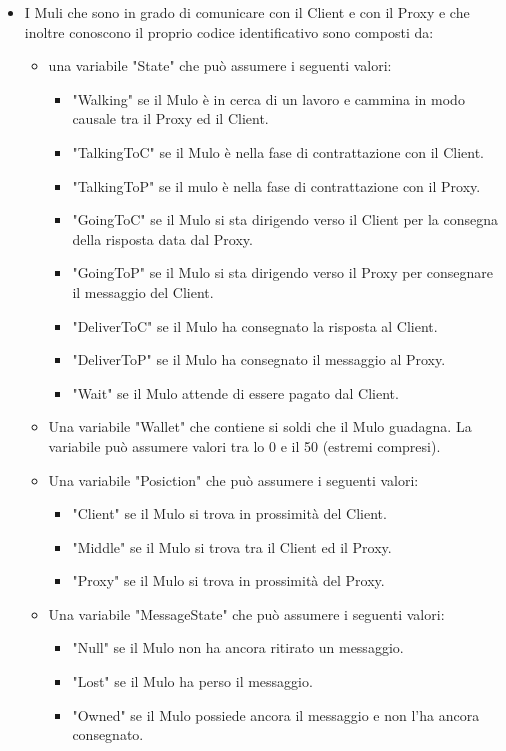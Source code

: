\documentclass[13pt,a4paper]{article}
\begin{document}
\begin{itemize}
	
	\item I Muli che sono in grado di comunicare con il Client e con il Proxy e che inoltre conoscono il proprio codice identificativo sono composti da:
	\begin{itemize}
		\item una variabile "State" che può assumere i seguenti valori:
		\begin{itemize}
			\item "Walking" se il Mulo è in cerca di un lavoro e cammina in modo causale tra il Proxy ed il Client.
			\item "TalkingToC" se il Mulo è nella fase di contrattazione con il Client.
			\item "TalkingToP" se il mulo è nella fase di contrattazione con il Proxy.
			\item "GoingToC" se il Mulo si sta dirigendo verso il Client per la consegna della risposta data dal Proxy.
			\item "GoingToP" se il Mulo si sta dirigendo verso il Proxy per consegnare il messaggio del Client.
			\item "DeliverToC" se il Mulo ha consegnato la risposta al Client.
			\item "DeliverToP" se il Mulo ha consegnato il messaggio al Proxy.
			\item "Wait" se il Mulo attende di essere pagato dal Client.
		\end{itemize}
		\item Una variabile "Wallet" che contiene si soldi che il Mulo guadagna.  La variabile può assumere valori tra lo 0 e il 50 (estremi compresi).
		\item Una variabile "Posiction" che può assumere i seguenti valori:
		\begin{itemize}
			\item "Client" se il Mulo si trova in prossimità del Client.
			\item "Middle" se il Mulo si trova tra il Client ed il Proxy.
			\item "Proxy" se il Mulo si trova in prossimità del Proxy.
		\end{itemize}
	\item Una variabile "MessageState" che può assumere i seguenti valori:
	\begin{itemize}
		\item "Null" se il Mulo non ha ancora ritirato un messaggio.
		\item "Lost" se il Mulo ha perso il messaggio.
		\item "Owned" se il Mulo possiede ancora il messaggio e non l'ha ancora consegnato. 

\end{itemize}
\end{itemize}
\end{itemize}
\end{document}

